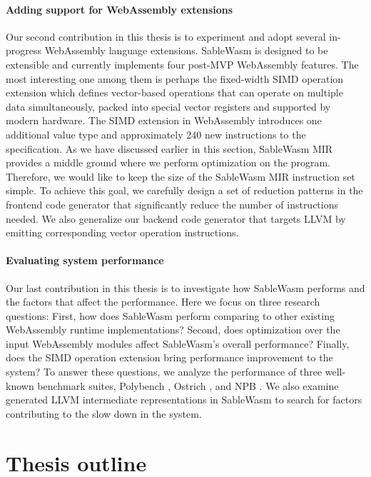 \paragraph{Adding support for WebAssembly extensions}
Our second contribution in this thesis is to experiment and adopt several
in-progress WebAssembly language extensions. SableWasm is designed to be
extensible and currently implements four post-MVP WebAssembly features. The
most interesting one among them is perhaps the fixed-width SIMD operation
extension which defines vector-based operations that can operate on multiple
data simultaneously, packed into special vector registers and supported by
modern hardware. The SIMD extension in WebAssembly
introduces one additional value type and approximately 240
new instructions to the specification. As we have discussed earlier in this
section, SableWasm MIR provides a middle ground where we perform optimization
on the program. Therefore, we would like to keep the size of the SableWasm MIR
instruction set simple. To achieve this goal, we carefully design a set of
reduction patterns in the frontend code generator that significantly reduce the
number of instructions needed. We also generalize our backend code generator
that targets LLVM by emitting corresponding vector operation instructions.

\paragraph{Evaluating system performance}
Our last contribution in this thesis is to investigate how SableWasm performs
and the factors that affect the performance. Here we focus on three research
questions: First, how does SableWasm perform comparing to other existing
WebAssembly runtime implementations? Second, does optimization over the input
WebAssembly modules affect SableWasm's overall performance? Finally, does the
SIMD operation extension bring performance improvement to the system? To answer
these questions, we analyze the performance of three well-known benchmark
suites, Polybench \cite{polybench}, Ostrich \cite{ostrich}, and NPB \cite{npb}.
We also examine generated LLVM intermediate representations in SableWasm to
search for factors contributing to the slow down in the system.

\section{Thesis outline}

